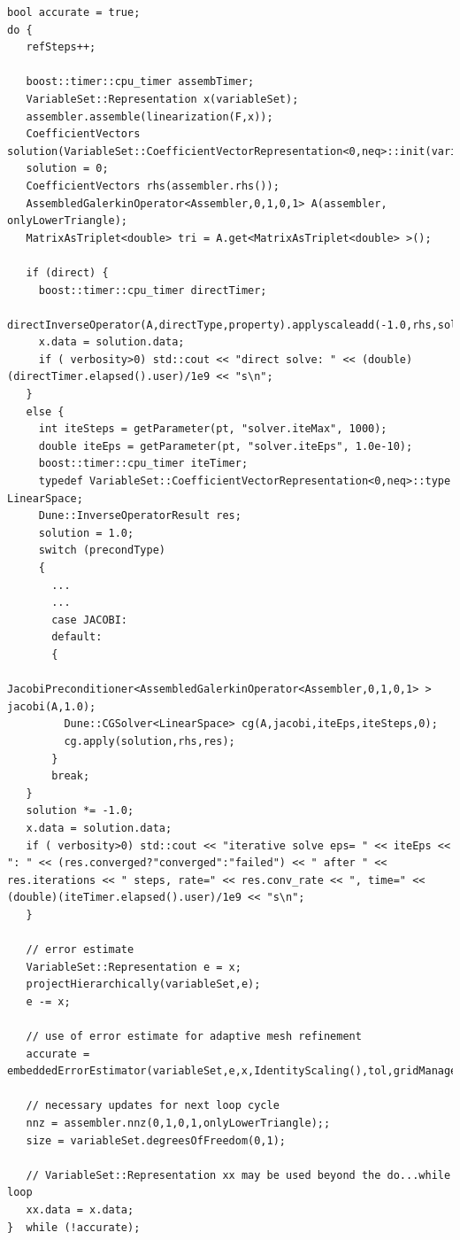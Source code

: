 \documentclass[11pt]{article}
\begin{document}
\begin{lstlisting}
bool accurate = true;
do {
   refSteps++;
    
   boost::timer::cpu_timer assembTimer;
   VariableSet::Representation x(variableSet);
   assembler.assemble(linearization(F,x));
   CoefficientVectors solution(VariableSet::CoefficientVectorRepresentation<0,neq>::init(variableSet));
   solution = 0;
   CoefficientVectors rhs(assembler.rhs());
   AssembledGalerkinOperator<Assembler,0,1,0,1> A(assembler, onlyLowerTriangle);
   MatrixAsTriplet<double> tri = A.get<MatrixAsTriplet<double> >();

   if (direct) {
     boost::timer::cpu_timer directTimer;
     directInverseOperator(A,directType,property).applyscaleadd(-1.0,rhs,solution);
     x.data = solution.data;
     if ( verbosity>0) std::cout << "direct solve: " << (double)(directTimer.elapsed().user)/1e9 << "s\n";
   }
   else {
     int iteSteps = getParameter(pt, "solver.iteMax", 1000);
     double iteEps = getParameter(pt, "solver.iteEps", 1.0e-10);
     boost::timer::cpu_timer iteTimer;
     typedef VariableSet::CoefficientVectorRepresentation<0,neq>::type LinearSpace;
     Dune::InverseOperatorResult res;
     solution = 1.0;
     switch (precondType)
     {
       ...
       ...
       case JACOBI:
       default:
       {
         JacobiPreconditioner<AssembledGalerkinOperator<Assembler,0,1,0,1> > jacobi(A,1.0);
         Dune::CGSolver<LinearSpace> cg(A,jacobi,iteEps,iteSteps,0);
         cg.apply(solution,rhs,res);
       }
       break;
   }
   solution *= -1.0;
   x.data = solution.data;
   if ( verbosity>0) std::cout << "iterative solve eps= " << iteEps << ": " << (res.converged?"converged":"failed") << " after " << res.iterations << " steps, rate=" << res.conv_rate << ", time=" << (double)(iteTimer.elapsed().user)/1e9 << "s\n";
   }
   
   // error estimate
   VariableSet::Representation e = x;
   projectHierarchically(variableSet,e);
   e -= x;      
  
   // use of error estimate for adaptive mesh refinement
   accurate = embeddedErrorEstimator(variableSet,e,x,IdentityScaling(),tol,gridManager);
   
   // necessary updates for next loop cycle
   nnz = assembler.nnz(0,1,0,1,onlyLowerTriangle);;
   size = variableSet.degreesOfFreedom(0,1);
	
   // VariableSet::Representation xx may be used beyond the do...while loop
   xx.data = x.data;
}  while (!accurate); 
\end{lstlisting}
\end{document}
